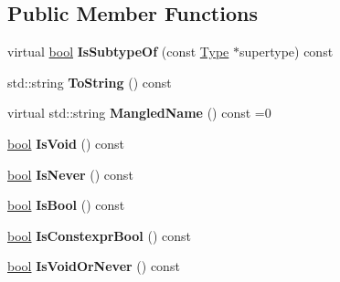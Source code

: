 \subsection*{Public Member Functions}
\begin{DoxyCompactItemize}
\item 
\mbox{\label{classv8_1_1internal_1_1torque_1_1Type_a43b4a9169d58ebb0c040e7407fabe817}} 
virtual \mbox{\hyperlink{classbool}{bool}} {\bfseries Is\+Subtype\+Of} (const \mbox{\hyperlink{classv8_1_1internal_1_1torque_1_1Type}{Type}} $\ast$supertype) const
\item 
\mbox{\label{classv8_1_1internal_1_1torque_1_1Type_ac42019595e0fef2def30ccb0e7d81b8f}} 
std\+::string {\bfseries To\+String} () const
\item 
\mbox{\label{classv8_1_1internal_1_1torque_1_1Type_ad09a02a3665dcfedf49e8daa20e939bf}} 
virtual std\+::string {\bfseries Mangled\+Name} () const =0
\item 
\mbox{\label{classv8_1_1internal_1_1torque_1_1Type_a7f3df7c4ba0438edda07343afe017bde}} 
\mbox{\hyperlink{classbool}{bool}} {\bfseries Is\+Void} () const
\item 
\mbox{\label{classv8_1_1internal_1_1torque_1_1Type_a21d17165396c6e339b437bac95a61564}} 
\mbox{\hyperlink{classbool}{bool}} {\bfseries Is\+Never} () const
\item 
\mbox{\label{classv8_1_1internal_1_1torque_1_1Type_a780adf8523c6c0adc03db3c7070511f0}} 
\mbox{\hyperlink{classbool}{bool}} {\bfseries Is\+Bool} () const
\item 
\mbox{\label{classv8_1_1internal_1_1torque_1_1Type_a22cf4783899a101e2a3d898ab7cb976a}} 
\mbox{\hyperlink{classbool}{bool}} {\bfseries Is\+Constexpr\+Bool} () const
\item 
\mbox{\label{classv8_1_1internal_1_1torque_1_1Type_a84b61e1c3017e4e37010985a431d8b50}} 
\mbox{\hyperlink{classbool}{bool}} {\bfseries Is\+Void\+Or\+Never} () const

\end{DoxyCompactItemize}
